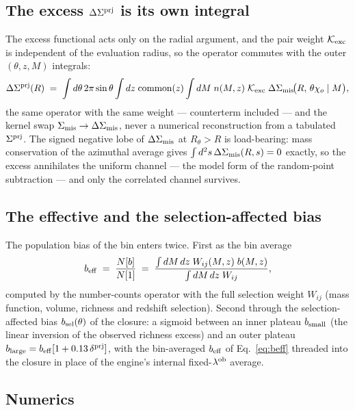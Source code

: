 \subsection{The excess $\Delta\Sigma^{\rm prj}$ is its own integral}

The excess functional acts only on the radial argument, and the pair
weight $\mathcal{K}_{\rm exc}$ is independent of the evaluation radius, so the operator
commutes with the outer $(\theta, z, M)$ integrals:
\begin{equation}
\Delta\Sigma^{\rm prj}(R) \;=\; \int d\theta\, 2\pi\sin\theta
  \int dz\;{\rm common}(z) \int dM\; n(M, z)\;
  \mathcal{K}_{\rm exc}\;
  \Delta\Sigma_{\rm mis}\!\big(R,\, \theta\chi_o \mid M\big),
\label{eq:kernelswap}
\end{equation}
the same operator with the same weight --- counterterm included --- and
the kernel swap $\Sigma_{\rm mis} \to \Delta\Sigma_{\rm mis}$, never a numerical reconstruction
from a tabulated $\Sigma^{\rm prj}$. The signed negative
lobe of $\Delta\Sigma_{\rm mis}$ at $R_\theta > R$ is load-bearing: mass conservation of
the azimuthal average gives $\int d^2s\, \Delta\Sigma_{\rm mis}(R, s) = 0$ exactly, so
the excess annihilates the uniform  channel --- the model form
of the random-point subtraction --- and only the correlated channel
survives.

\subsection{The effective and the selection-affected bias}

The population bias of the bin enters twice. First as the bin average
\begin{equation}
b_{\rm eff} \;=\; \frac{N[b]}{N[1]}
\;=\; \frac{\int dM\,dz\; W_{ij}(M, z)\; b(M, z)}{\int dM\,dz\; W_{ij}},
\label{eq:beff}
\end{equation}
computed by the number-counts operator 
with the full selection weight $W_{ij}$ (mass function, volume, richness
and redshift selection). Second through the selection-affected bias
$b_{\rm sel}(\theta)$ of the  closure: a sigmoid between
an inner plateau $b_{\rm small}$ (the linear inversion of the observed
richness excess) and an outer plateau
$b_{\rm large} = b_{\rm eff}[1 + 0.13\,\delta^{\rm prj}]$, with the bin-averaged
$b_{\rm eff}$ of Eq.~\eqref{eq:beff} threaded into the closure in place of the
engine's internal fixed-$\lambda^{\rm ob}$ average.

\subsection{Numerics}

